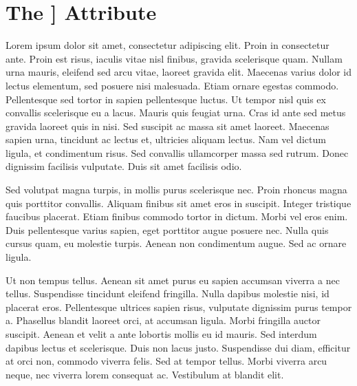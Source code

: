 \newpage
{}
\section[{\tt [[carries\_dependency]]}\hspace*{1em}(The {\tt [[carries\_dependency]]} Attribute)]{The {\SecCode [[carries\_dependency]]} Attribute}\label{carriesdependency}




Lorem ipsum dolor sit amet, consectetur adipiscing elit. Proin in consectetur ante. Proin est risus, iaculis vitae nisl finibus, gravida scelerisque quam. Nullam urna mauris, eleifend sed arcu vitae, laoreet gravida elit. Maecenas varius dolor id lectus elementum, sed posuere nisi malesuada. Etiam ornare egestas commodo. Pellentesque sed tortor in sapien pellentesque luctus. Ut tempor nisl quis ex convallis scelerisque eu a lacus. Mauris quis feugiat urna. Cras id ante sed metus gravida laoreet quis in nisi. Sed suscipit ac massa sit amet laoreet. Maecenas sapien urna, tincidunt ac lectus et, ultricies aliquam lectus. Nam vel dictum ligula, et condimentum risus. Sed convallis ullamcorper massa sed rutrum. Donec dignissim facilisis vulputate. Duis sit amet facilisis odio.

Sed volutpat magna turpis, in mollis purus scelerisque nec. Proin rhoncus magna quis porttitor convallis. Aliquam finibus sit amet eros in suscipit. Integer tristique faucibus placerat. Etiam finibus commodo tortor in dictum. Morbi vel eros enim. Duis pellentesque varius sapien, eget porttitor augue posuere nec. Nulla quis cursus quam, eu molestie turpis. Aenean non condimentum augue. Sed ac ornare ligula.

Ut non tempus tellus. Aenean sit amet purus eu sapien accumsan viverra a nec tellus. Suspendisse tincidunt eleifend fringilla. Nulla dapibus molestie nisi, id placerat eros. Pellentesque ultrices sapien risus, vulputate dignissim purus tempor a. Phasellus blandit laoreet orci, at accumsan ligula. Morbi fringilla auctor suscipit. Aenean et velit a ante lobortis mollis eu id mauris. Sed interdum dapibus lectus et scelerisque. Duis non lacus justo. Suspendisse dui diam, efficitur at orci non, commodo viverra felis. Sed at tempor tellus. Morbi viverra arcu neque, nec viverra lorem consequat ac. Vestibulum at blandit elit.

